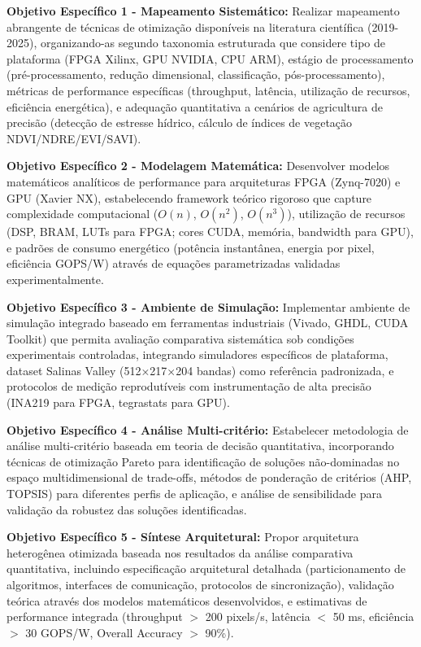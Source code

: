 \textbf{Objetivo Específico 1 - Mapeamento Sistemático:} Realizar mapeamento 
abrangente de técnicas de otimização disponíveis na literatura científica 
(2019-2025), organizando-as segundo taxonomia estruturada que considere tipo 
de plataforma (FPGA Xilinx, GPU NVIDIA, CPU ARM), estágio de processamento 
(pré-processamento, redução dimensional, classificação, pós-processamento), 
métricas de performance específicas (throughput, latência, utilização de 
recursos, eficiência energética), e adequação quantitativa a cenários de 
agricultura de precisão (detecção de estresse hídrico, cálculo de índices 
de vegetação NDVI/NDRE/EVI/SAVI).

\textbf{Objetivo Específico 2 - Modelagem Matemática:} Desenvolver modelos 
matemáticos analíticos de performance para arquiteturas FPGA (Zynq-7020) e 
GPU (Xavier NX), estabelecendo framework teórico rigoroso que capture 
complexidade computacional ($O(n)$, $O(n^2)$, $O(n^3)$), utilização de 
recursos (DSP, BRAM, LUTs para FPGA; cores CUDA, memória, bandwidth para GPU), 
e padrões de consumo energético (potência instantânea, energia por pixel, 
eficiência GOPS/W) através de equações parametrizadas validadas experimentalmente.

\textbf{Objetivo Específico 3 - Ambiente de Simulação:} Implementar ambiente 
de simulação integrado baseado em ferramentas industriais (Vivado, 
GHDL, CUDA Toolkit) que permita avaliação comparativa sistemática 
sob condições experimentais controladas, integrando simuladores específicos 
de plataforma, dataset Salinas Valley (512×217×204 bandas) como referência 
padronizada, e protocolos de medição reprodutíveis com instrumentação de 
alta precisão (INA219 para FPGA, tegrastats para GPU).

\textbf{Objetivo Específico 4 - Análise Multi-critério:} Estabelecer 
metodologia de análise multi-critério baseada em teoria de decisão 
quantitativa, incorporando técnicas de otimização Pareto para identificação 
de soluções não-dominadas no espaço multidimensional de trade-offs, métodos 
de ponderação de critérios (AHP, TOPSIS) para diferentes perfis de aplicação, 
e análise de sensibilidade para validação da robustez das soluções identificadas.

\textbf{Objetivo Específico 5 - Síntese Arquitetural:} Propor arquitetura 
heterogênea otimizada baseada nos resultados da análise comparativa 
quantitativa, incluindo especificação arquitetural detalhada (particionamento 
de algoritmos, interfaces de comunicação, protocolos de sincronização), 
validação teórica através dos modelos matemáticos desenvolvidos, e estimativas 
de performance integrada (throughput $>$ 200 pixels/s, latência $<$ 50 ms, 
eficiência $>$ 30 GOPS/W, Overall Accuracy $>$ 90\%).

